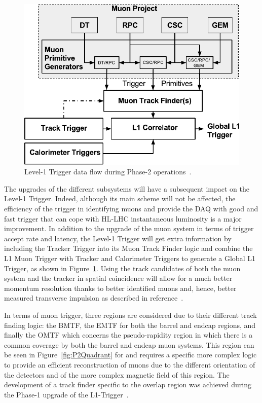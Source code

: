 \begingroup\setlength{\intextsep}{5pt}\setlength{\columnsep}{15pt}

	\begin{figure}
		\centering
		\includegraphics[width=\linewidth]{fig/chapt4/Phase-II-L1-Trigger.pdf}
		\caption{\label{fig:L1-trigger} Level-1 Trigger data flow during Phase-2 operations~\cite{PHASEIITP}.}
	\end{figure}

	The upgrades of the different subsystems will have a subsequent impact on the Level-1 Trigger. Indeed, although its main scheme will not be affected, the efficiency of the trigger in identifying muons and provide the DAQ with good and fast trigger that can cope with HL-LHC instantaneous luminosity is a major improvement. In addition to the upgrade of the muon system in terms of trigger accept rate and latency, the Level-1 Trigger will get extra information by including the Tracker Trigger into its Muon Track Finder logic and combine the L1 Muon Trigger with Tracker and Calorimeter Triggers to generate a Global L1 Trigger, as shown in Figure~\ref{fig:L1-trigger}. Using the track candidates of both the muon system and the tracker in spatial coincidence will allow for a much better momentum resolution thanks to better identified muons and, hence, better measured transverse impulsion as described in reference~\cite{PHASEIITP}.
	
\endgroup
	
	In terms of muon trigger, three regions are considered due to their different track finding logic: the \acf{BMTF}, the \acf{EMTF} for both the barrel and endcap regions, and finally the \acf{OMTF} which concerns the pseudo-rapidity region in which there is a common coverage by both the barrel and endcap muon systems. This region can be seen in Figure~\ref{fig:P2Quadrant} for  and requires a specific more complex logic to provide an efficient reconstruction of muons due to the different orientation of the detectors and of the more complex magnetic field of this region. The development of a track finder specific to the overlap region was achieved during the Phase-1 upgrade of the L1-Trigger~\cite{L1UPGRADE2016}.
	

